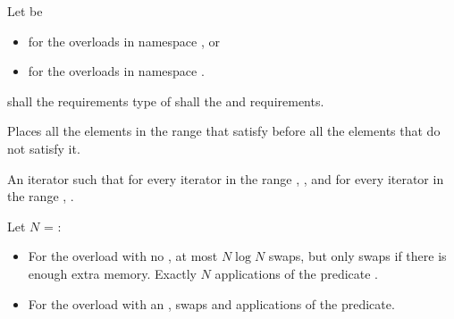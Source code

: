 \begin{itemdescr}
\begin{addedblock}
\pnum
Let  be
\begin{itemize}
\item {} for the overloads in namespace , or
\item {} for the overloads in
  namespace .
\end{itemize}
\end{addedblock}

\pnum
\requires
{}
 shall  the
 requirements  type of  shall 
 the
 and
 requirements.

\pnum
\effects
Places all the elements in the range
that satisfy   before all the
elements that do not satisfy it.

\pnum
\returns
An iterator
such that for every iterator
in the range
,
,
and for every iterator
in the range
,
.

\pnum
\complexity
Let $N$ = :
\begin{itemize}
\item For the overload with no ,
at most $N \log N$ swaps,
but only  swaps if there is enough extra memory.
Exactly $N$ applications of the predicate .
\item For the overload with an ,
 swaps and  applications of the predicate.
\end{itemize}
\end{itemdescr}

